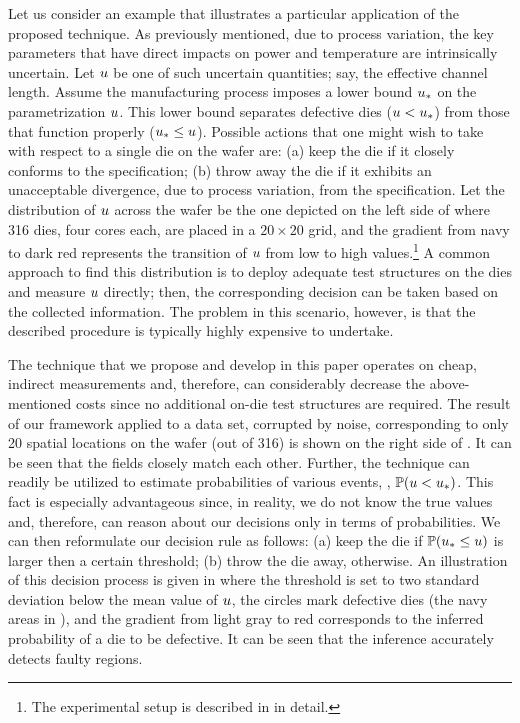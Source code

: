 
Let us consider an example that illustrates a particular application of the proposed technique. As previously mentioned, due to process variation, the key parameters that have direct impacts on power and temperature are intrinsically uncertain. Let $u$ be one of such uncertain quantities; say, the effective channel length. Assume the manufacturing process imposes a lower bound $u_*$ on the parametrization $u$. This lower bound separates defective dies ($u < u_*$) from those that function properly ($u_* \leq u$). Possible actions that one might wish to take with respect to a single die on the wafer are: (a) keep the die if it closely conforms to the specification; (b) throw away the die if it exhibits an unacceptable divergence, due to process variation, from the specification. Let the distribution of $u$ across the wafer be the one depicted on the left side of  where 316 dies, four cores each, are placed in a $20 \times 20$ grid, and the gradient from navy to dark red represents the transition of $u$ from low to high values.\footnote{The experimental setup is described in  in detail.} A common approach to find this distribution is to deploy adequate test structures on the dies and measure $u$ directly; then, the corresponding decision can be taken based on the collected information. The problem in this scenario, however, is that the described procedure is typically highly expensive to undertake.

The technique that we propose and develop in this paper operates on cheap, indirect measurements and, therefore, can considerably decrease the above-mentioned costs since no additional on-die test structures are required. The result of our framework applied to a data set, corrupted by noise, corresponding to only 20 spatial locations on the wafer (out of 316) is shown on the right side of . It can be seen that the fields closely match each other. Further, the technique can readily be utilized to estimate probabilities of various events, \eg, $\mathbb{P}(u < u_*)$. This fact is especially advantageous since, in reality, we do not know the true values and, therefore, can reason about our decisions only in terms of probabilities. We can then reformulate our decision rule as follows: (a) keep the die if $\mathbb{P}(u_* \leq u)$ is larger then a certain threshold; (b) throw the die away, otherwise. An illustration of this decision process is given in  where the threshold is set to two standard deviation below the mean value of $u$, the circles mark defective dies (the navy areas in ), and the gradient from light gray to red corresponds to the inferred probability of a die to be defective. It can be seen that the inference accurately detects faulty regions.


